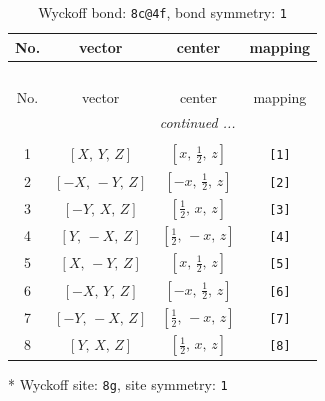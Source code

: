 \documentclass[fleqn,8pt]{jsarticle}
\begin{document}
\renewcommand{\arraystretch}{1.2}
\begin{longtable}{cccc}
\caption{Wyckoff bond: {\tt 8c@4f}, bond symmetry: {\tt 1}}
 \\
 \hline \hline
No. & vector & center & mapping \\ \hline \endfirsthead

\multicolumn{3}{l}{\tablename\ \thetable{}} \\
 \hline \hline
No. & vector & center & mapping \\ \hline \endhead

 \hline \hline
\multicolumn{3}{r}{\footnotesize\it continued ...} \\ \endfoot

 \hline \hline
\multicolumn{3}{r}{} \\ \endlastfoot

1 & $\left[ X,\, Y,\, Z \right]$ & $\left[ x,\, \frac{1}{2},\, z \right]$ & {\tt [1]} \\ \hline
2 & $\left[ - X,\, - Y,\, Z \right]$ & $\left[ - x,\, \frac{1}{2},\, z \right]$ & {\tt [2]} \\ \hline
3 & $\left[ - Y,\, X,\, Z \right]$ & $\left[ \frac{1}{2},\, x,\, z \right]$ & {\tt [3]} \\ \hline
4 & $\left[ Y,\, - X,\, Z \right]$ & $\left[ \frac{1}{2},\, - x,\, z \right]$ & {\tt [4]} \\ \hline
5 & $\left[ X,\, - Y,\, Z \right]$ & $\left[ x,\, \frac{1}{2},\, z \right]$ & {\tt [5]} \\ \hline
6 & $\left[ - X,\, Y,\, Z \right]$ & $\left[ - x,\, \frac{1}{2},\, z \right]$ & {\tt [6]} \\ \hline
7 & $\left[ - Y,\, - X,\, Z \right]$ & $\left[ \frac{1}{2},\, - x,\, z \right]$ & {\tt [7]} \\ \hline
8 & $\left[ Y,\, X,\, Z \right]$ & $\left[ \frac{1}{2},\, x,\, z \right]$ & {\tt [8]} \\
\end{longtable}
* Wyckoff site: {\tt 8g}, site symmetry: {\tt 1}
\renewcommand{\arraystretch}{1.2}
\end{document}
